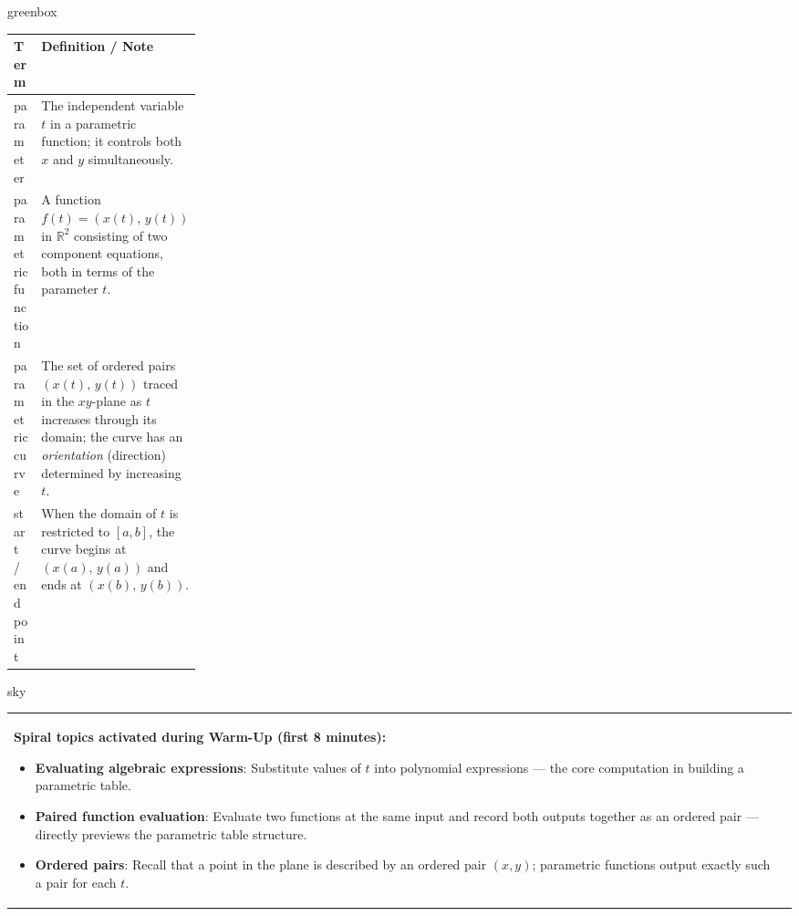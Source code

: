 \documentclass[10pt]{article}
\begin{document}
\begin{skillbox}{greenbox}
\begin{tabularx}{\linewidth}{@{} p{0.24\linewidth} X @{}}
\textbf{Term} & \textbf{Definition / Note} \\
\midrule
parameter &
  The independent variable $t$ in a parametric function; it controls
  both $x$ and $y$ simultaneously. \\[4pt]
parametric function &
  A function $f(t) = (x(t),\, y(t))$ in $\mathbb{R}^2$ consisting of
  two component equations, both in terms of the parameter $t$. \\[4pt]
parametric curve &
  The set of ordered pairs $(x(t),\, y(t))$ traced in the $xy$-plane
  as $t$ increases through its domain; the curve has an
  \emph{orientation} (direction) determined by increasing $t$. \\[4pt]
start / end point &
  When the domain of $t$ is restricted to $[a, b]$, the curve begins
  at $(x(a),\, y(a))$ and ends at $(x(b),\, y(b))$. \\
\end{tabularx}
\end{skillbox}

\vspace{0.08in}

\begin{skillbox}{sky}
\begin{tabularx}{\linewidth}{@{}X c@{}}
\begin{minipage}[t]{0.96\linewidth}\vspace{0pt}
\textbf{Spiral topics activated during Warm-Up (first 8 minutes):}
\begin{itemize}[leftmargin=1.4em, itemsep=2pt]
  \item \textbf{Evaluating algebraic expressions}: Substitute values of
    $t$ into polynomial expressions --- the core computation in building
    a parametric table.
  \item \textbf{Paired function evaluation}: Evaluate two functions at
    the same input and record both outputs together as an ordered pair
    --- directly previews the parametric table structure.
  \item \textbf{Ordered pairs}: Recall that a point in the plane is
    described by an ordered pair $(x, y)$; parametric functions output
    exactly such a pair for each $t$.
\end{itemize}
\end{minipage}
&
\end{tabularx}
\end{skillbox}
\end{document}
